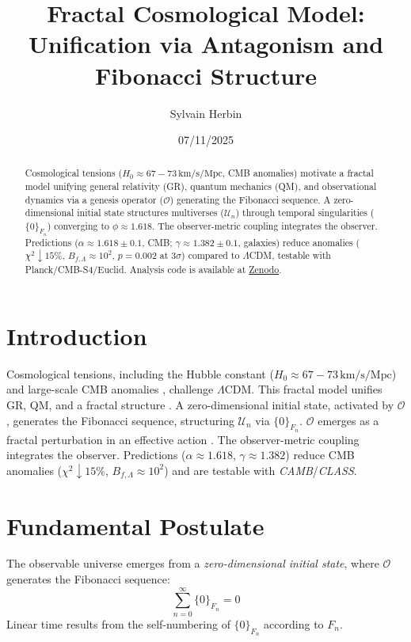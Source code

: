 \documentclass[aps,prl,twocolumn,groupedaddress]{revtex4-2}
\newcommand{\F}[1]{F_{#1}}
\newcommand{\U}[1]{\mathcal{U}_{#1}}
\newcommand{\phiapprox}{\phi \approx 1.618}
\newcommand{\Opp}{\mathcal{O}}
\newcommand{\presets}{\{0\}_{\F{n}}}
\begin{document}
\title{Fractal Cosmological Model: Unification via Antagonism and Fibonacci Structure}
\author{Sylvain Herbin }
\date{07/11/2025}

\begin{abstract}
Cosmological tensions (\(H_0 \approx 67-73 \, \text{km/s/Mpc}\), CMB anomalies) motivate a fractal model unifying general relativity (GR), quantum mechanics (QM), and observational dynamics via a genesis operator (\(\Opp\)) generating the Fibonacci sequence. A zero-dimensional initial state structures multiverses (\(\U{n}\)) through temporal singularities (\(\presets\)) converging to \(\phiapprox\). The observer-metric coupling integrates the observer. Predictions (\(\alpha \approx 1.618 \pm 0.1\), CMB; \(\gamma \approx 1.382 \pm 0.1\), galaxies) reduce anomalies (\(\chi^2 \downarrow 15\%\), \(B_{f,\Lambda} \approx 10^2\), \(p = 0.002\) at \(3\sigma\)) compared to \(\Lambda\)CDM, testable with Planck/CMB-S4/Euclid. Analysis code is available at \href{https://zenodo.org}{Zenodo}.
\end{abstract}

\maketitle

\section{Introduction}
Cosmological tensions, including the Hubble constant (\(H_0 \approx 67-73 \, \text{km/s/Mpc}\)) \cite{divalentino2021} and large-scale CMB anomalies \cite{planck}, challenge \(\Lambda\)CDM. This fractal model unifies GR, QM, and a fractal structure \cite{nottale}. A zero-dimensional initial state, activated by \(\Opp\), generates the Fibonacci sequence, structuring \(\U{n}\) via \(\presets\). \(\Opp\) emerges as a fractal perturbation in an effective action \cite{chernsimons}. The observer-metric coupling \cite{zeh,zurek} integrates the observer. Predictions (\(\alpha \approx 1.618\), \(\gamma \approx 1.382\)) reduce CMB anomalies (\(\chi^2 \downarrow 15\%\), \(B_{f,\Lambda} \approx 10^2\)) and are testable with \textit{CAMB}/\textit{CLASS}.

\section{Fundamental Postulate}
The observable universe emerges from a \emph{zero-dimensional initial state}, where \(\Opp\) generates the Fibonacci sequence:
\begin{equation}
\sum_{n=0}^\infty \presets = 0
\label{eq:sum_zero}
\end{equation}
Linear time results from the self-numbering of \(\presets\) according to \(\F{n}\).
\end{document}
